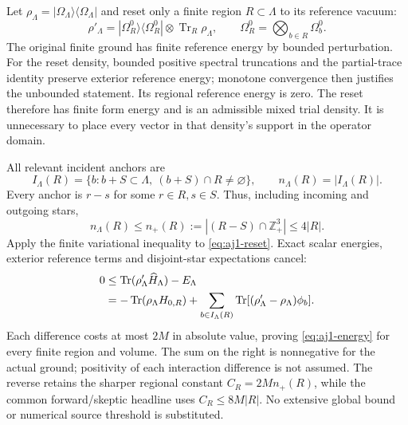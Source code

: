 Let $\rho_\Lambda=|\Omega_\Lambda\rangle\langle\Omega_\Lambda|$ and reset only a finite region $R\subset\Lambda$ to its reference vacuum:
\begin{equation}
 \rho'_\Lambda=|\Omega_R^0\rangle\langle\Omega_R^0|
               \otimes\operatorname{Tr}_R\rho_\Lambda,
 \qquad\Omega_R^0=\bigotimes_{b\in R}\Omega_b^0.
 \label{eq:aj1-reset}
\end{equation}
The original finite ground has finite reference energy by bounded perturbation. For the reset density, bounded positive spectral truncations and the partial-trace identity preserve exterior reference energy; monotone convergence then justifies the unbounded statement. Its regional reference energy is zero. The reset therefore has finite form energy and is an admissible mixed trial density. It is unnecessary to place every vector in that density's support in the operator domain.

All relevant incident anchors are
\begin{equation}
 I_\Lambda(R)=\{b:b+S\subset\Lambda,\ (b+S)\cap R\ne\varnothing\},
 \qquad n_\Lambda(R)=|I_\Lambda(R)|.
\end{equation}
Every anchor is $r-s$ for some $r\in R,s\in S$. Thus, including incoming and outgoing stars,
\begin{equation}
 n_\Lambda(R)\le n_+(R):=|(R-S)\cap\mathbb Z_+^3|\le4|R|.
 \label{eq:aj1-incidence}
\end{equation}
Apply the finite variational inequality to \eqref{eq:aj1-reset}. Exact scalar energies, exterior reference terms and disjoint-star expectations cancel:
\begin{align}
 0&\le\operatorname{Tr}(\rho'_\Lambda\widehat H_\Lambda)-E_\Lambda\notag\\
 &=-\operatorname{Tr}(\rho_\Lambda H_{0,R})
   +\sum_{b\in I_\Lambda(R)}
       \operatorname{Tr}[(\rho'_\Lambda-\rho_\Lambda)\phi_b].
 \label{eq:aj1-variational}
\end{align}
Each difference costs at most $2M$ in absolute value, proving \eqref{eq:aj1-energy} for every finite region and volume. The sum on the right is nonnegative for the actual ground; positivity of each interaction difference is not assumed. The reverse retains the sharper regional constant $C_R=2Mn_+(R)$, while the common forward/skeptic headline uses $C_R\le8M|R|$. No extensive global bound or numerical source threshold is substituted.

